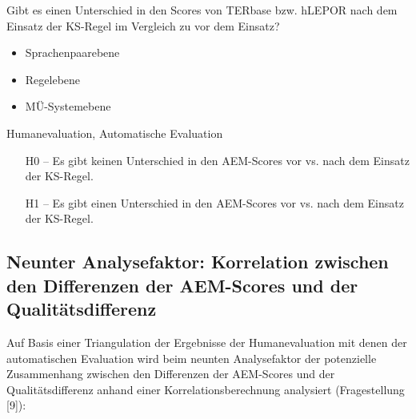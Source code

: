 \begin{description}[font=\normalfont\bfseries]
\item [Fragestellung] Gibt es einen Unterschied in den Scores von TERbase bzw. hLEPOR nach dem Einsatz der KS-Regel im Vergleich zu vor dem Einsatz?
\item [Analyseebene]\hfill
  \begin{itemize}
  \item Sprachenpaarebene
  \item Regelebene
  \item MÜ-Systemebene
  \end{itemize}
\item [Analysemethode] Humanevaluation, Automatische Evaluation
\item [Hypothesen]\hfill
  \begin{itemize}
  \item [H0] -- Es gibt keinen Unterschied in den AEM-Scores vor vs. nach dem Einsatz der KS-Regel.
  \item [H1] -- Es gibt einen Unterschied in den AEM-Scores vor vs. nach dem Einsatz der KS-Regel.
  \end{itemize}
\end{description}


\subsection*{Neunter Analysefaktor: Korrelation zwischen den Differenzen der AEM-Scores und der Qualitätsdifferenz}

Auf Basis einer Triangulation der Ergebnisse der Humanevaluation mit denen der automatischen Evaluation wird beim neunten Analysefaktor der potenzielle Zusammenhang zwischen den Differenzen der AEM-Scores und der Qualitätsdifferenz anhand einer Korrelationsberechnung analysiert (Fragestellung [9]):

